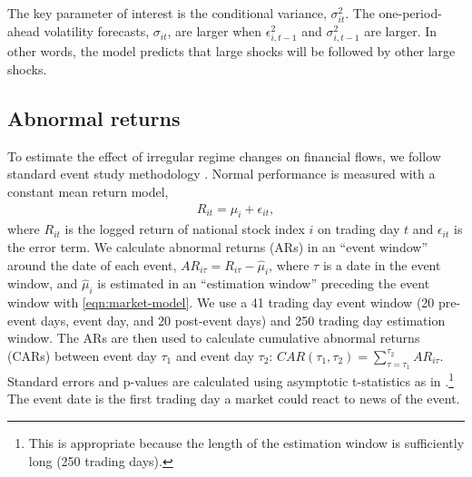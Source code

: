 \documentclass[12pt,final,fleqn]{article}
\theoremstyle{plain}
\begin{document}
The key parameter of interest is the conditional variance, $\sigma_{it}^2$. The one-period-ahead volatility forecasts, $\sigma_{it}$, are larger when $\epsilon_{i,t-1}^2$ and $\sigma_{i,t-1}^2$ are larger. In other words, the model predicts that large shocks will be followed by other large shocks.

\subsection{Abnormal returns} \label{subsec:abnormal-returns}



To estimate the effect of irregular regime changes on financial flows, we follow standard event study methodology \citep{mackinlay1997event, campbell1997econometrics}. Normal performance is measured with a constant mean return model,
\begin{align} \label{eqn:market-model}
R_{it}=\mu_{i}+\epsilon_{it},
\end{align}
where $R_{it}$ is the logged return of national stock index $i$ on trading day $t$ and $\epsilon_{it}$ is the error term. We calculate abnormal returns (ARs) in an ``event window'' around the date of each event, $AR_{i\tau}=R_{i\tau}-\widehat{\mu}_i$, where $\tau$ is a date in the event window, and $\widehat{\mu}_i$ is estimated in an ``estimation window'' preceding the event window with \autoref{eqn:market-model}. We use a 41 trading day event window (20 pre-event days, event day, and 20 post-event days) and 250 trading day estimation window. The ARs are then used to calculate cumulative abnormal returns (CARs) between event day $\tau_1$ and event day $\tau_2$: $CAR(\tau_1,\tau_2)=\sum_{\tau=\tau_1}^{\tau_2}AR_{i\tau}$. Standard errors and p-values are calculated using asymptotic t-statistics as in \citet{mackinlay1997event}.\footnote{This is appropriate because the length of the estimation window is sufficiently long (250 trading days).} The event date is the first trading day a market could react to news of the event.

\end{document}
